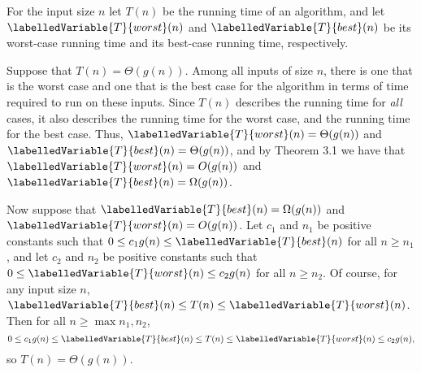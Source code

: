 \newcommand{\Tworst}{\labelledVariable{T}{worst}(n)}
\newcommand{\Tbest}{\labelledVariable{T}{best}(n)}
For the input size $n$ let $T(n)$ be the running time of an algorithm, and let $\Tworst$ and $\Tbest$ be its worst-case running time and its best-case running time, respectively.

Suppose that $T(n)=\Theta(g(n))$.
Among all inputs of size $n$, there is one that is the worst case and one that is the best case for the algorithm in terms of time required to run on these inputs.
Since $T(n)$ describes the running time for \emph{all} cases, it also describes the running time for the worst case, and the running time for the best case.
Thus, $\Tworst=\Theta(g(n))$ and $\Tbest=\Theta(g(n))$, and by Theorem 3.1 we have that $\Tworst=O(g(n))$ and $\Tbest=\Omega(g(n))$.

Now suppose that $\Tbest=\Omega(g(n))$ and $\Tworst=O(g(n))$.
Let $c_1$ and $n_1$ be positive constants such that $0\le c_1g(n)\le\Tbest$ for all $n\ge n_1$, and let $c_2$ and $n_2$ be positive constants such that $0\le\Tworst\le c_2g(n)$ for all $n\ge n_2$.
Of course, for any input size $n$, $\Tbest\le T(n)\le\Tworst$.
Then for all $n\ge\max{n_1,n_2}$,
\[
    0 \le c_1g(n) \le \Tbest \le T(n) \le \Tworst \le c_2g(n),
\]
so $T(n)=\Theta(g(n))$.
